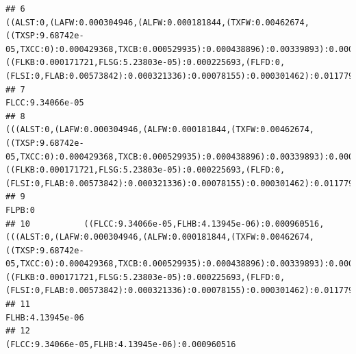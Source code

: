 \documentclass[]{article}
\begin{document}
\begin{verbatim}
## 6                                                                                             ((ALST:0,(LAFW:0.000304946,(ALFW:0.000181844,(TXFW:0.00462674,((TXSP:9.68742e-05,TXCC:0):0.000429368,TXCB:0.000529935):0.000438896):0.00339893):0.000450879):0.000633288):0.00274534,((FLKB:0.000171721,FLSG:5.23803e-05):0.000225693,(FLFD:0,(FLSI:0,FLAB:0.00573842):0.000321336):0.00078155):0.000301462):0.0117792
## 7                                                                                                                                                                                                                                                                                                                                                                                                   FLCC:9.34066e-05
## 8                                                                (((ALST:0,(LAFW:0.000304946,(ALFW:0.000181844,(TXFW:0.00462674,((TXSP:9.68742e-05,TXCC:0):0.000429368,TXCB:0.000529935):0.000438896):0.00339893):0.000450879):0.000633288):0.00274534,((FLKB:0.000171721,FLSG:5.23803e-05):0.000225693,(FLFD:0,(FLSI:0,FLAB:0.00573842):0.000321336):0.00078155):0.000301462):0.0117792,FLLG:0.0165186):0.000474876
## 9                                                                                                                                                                                                                                                                                                                                                                                                             FLPB:0
## 10           ((FLCC:9.34066e-05,FLHB:4.13945e-06):0.000960516,(((ALST:0,(LAFW:0.000304946,(ALFW:0.000181844,(TXFW:0.00462674,((TXSP:9.68742e-05,TXCC:0):0.000429368,TXCB:0.000529935):0.000438896):0.00339893):0.000450879):0.000633288):0.00274534,((FLKB:0.000171721,FLSG:5.23803e-05):0.000225693,(FLFD:0,(FLSI:0,FLAB:0.00573842):0.000321336):0.00078155):0.000301462):0.0117792,FLLG:0.0165186):0.000474876):0
## 11                                                                                                                                                                                                                                                                                                                                                                                                  FLHB:4.13945e-06
## 12                                                                                                                                                                                                                                                                                                                                                                   (FLCC:9.34066e-05,FLHB:4.13945e-06):0.000960516

\end{verbatim}
\end{document}
